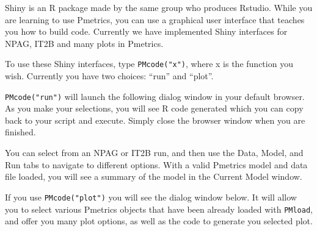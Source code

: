 \documentclass[
]{book}
\begin{document}
Shiny is an R package made by the same group who produces Rstudio. While
you are learning to use Pmetrics, you can use a graphical user interface
that teaches you how to build code. Currently we have implemented Shiny
interfaces for NPAG, IT2B and many plots in Pmetrics.

To use these Shiny interfaces, type \texttt{PMcode("x")}, where x is the function
you wish. Currently you have two choices: ``run'' and ``plot''.

\texttt{PMcode("run")} will launch the following dialog window in your default
browser. As you make your selections, you will see R code generated
which you can copy back to your script and execute. Simply close the
browser window when you are finished.

You can select from an NPAG or IT2B run, and then use the Data, Model,
and Run tabs to navigate to different options. With a valid Pmetrics
model and data file loaded, you will see a summary of the model in the
Current Model window.

If you use \texttt{PMcode("plot")} you will see the dialog window below. It will
allow you to select various Pmetrics objects that have been already
loaded with \texttt{PMload}, and offer you many plot options, as well as the
code to generate you selected plot.

  
\end{document}
